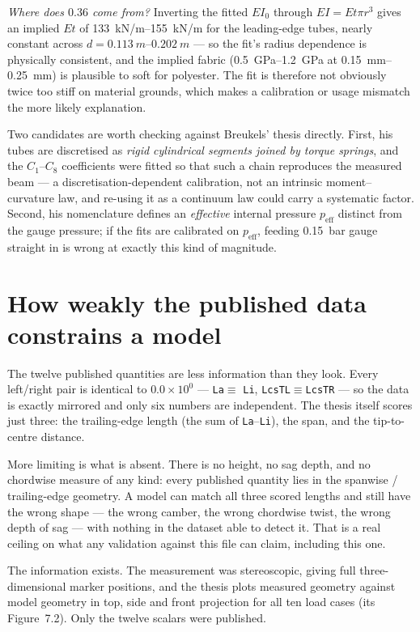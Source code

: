 \documentclass[11pt,a4paper]{article}
\begin{document}
\emph{Where does $0.36$ come from?} Inverting the fitted $EI_0$ through
$EI = E t \pi r^3$ gives an implied $E t$ of \SIrange{133}{155}{kN/m} for the
leading-edge tubes, nearly constant across $d = \SIrange{0.113}{0.202}{m}$ ---
so the fit's radius dependence is physically consistent, and the implied fabric
(\SIrange{0.5}{1.2}{GPa} at \SIrange{0.15}{0.25}{mm}) is plausible to soft for
polyester. The fit is therefore not obviously twice too stiff on material
grounds, which makes a calibration or usage mismatch the more likely
explanation.

Two candidates are worth checking against Breukels' thesis directly. First, his
tubes are discretised as \emph{rigid cylindrical segments joined by torque
springs}, and the $C_1$--$C_8$ coefficients were fitted so that such a chain
reproduces the measured beam --- a discretisation-dependent calibration, not an
intrinsic moment--curvature law, and re-using it as a continuum law could carry
a systematic factor. Second, his nomenclature defines an \emph{effective}
internal pressure $p_\text{eff}$ distinct from the gauge pressure; if the fits
are calibrated on $p_\text{eff}$, feeding \SI{0.15}{bar} gauge straight in is
wrong at exactly this kind of magnitude.

\section{How weakly the published data constrains a model}

The twelve published quantities are less information than they look. Every
left/right pair is identical to $0.0\times10^{0}$ --- \texttt{La}$\equiv$%
\texttt{Li}, \texttt{LcsTL}$\equiv$\texttt{LcsTR} --- so the data is exactly
mirrored and only six numbers are independent. The thesis itself scores just
three: the trailing-edge length (the sum of \texttt{La}--\texttt{Li}), the span,
and the tip-to-centre distance.

More limiting is what is absent. There is no height, no sag depth, and no
chordwise measure of any kind: every published quantity lies in the spanwise /
trailing-edge geometry. A model can match all three scored lengths and still
have the wrong shape --- the wrong camber, the wrong chordwise twist, the wrong
depth of sag --- with nothing in the dataset able to detect it. That is a real
ceiling on what any validation against this file can claim, including this one.

The information exists. The measurement was stereoscopic, giving full
three-dimensional marker positions, and the thesis plots measured geometry
against model geometry in top, side and front projection for all ten load cases
(its Figure~7.2). Only the twelve scalars were published.
\end{document}
